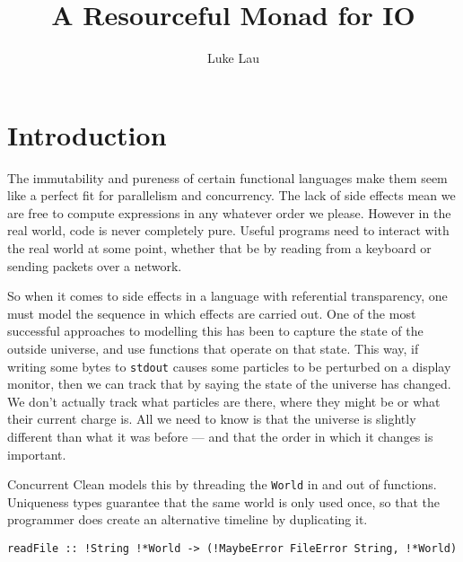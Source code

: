 \documentclass{report}
\begin{document}
\newcommand{\llbracket}{[\![}
\newcommand{\rrbracket}{]\!]}
\newcommand{\IO}{\mathsf{IO}}
\newcommand{\bind}{>\!\!>\!\!=} \newcommand{\concbind}{>\!\!>\!>\!\!=}
\newcommand{\subtyp}{\geq:}
\newcommand{\notsubtyp}{\ngeq:}
\newcommand{\lift}[1]{\ensuremath{\llbracket#1\rrbracket}}
\newcommand{\use}[2]{\ensuremath{\llbracket#2\rrbracket_{#1}}}
\newcommand{\ftv}{\operatorname{FTV}}
\newcommand{\fv}{\operatorname{FV}}
\newtheorem{theorem}{Theorem}
\newtheorem{lemma}{Lemma}

\author{Luke Lau}
\title{A Resourceful Monad for IO}
\begin{titlepage}
  \maketitle
\end{titlepage}

\chapter{Introduction}
The immutability and pureness of certain functional languages make them seem
like a perfect fit for parallelism and concurrency. The lack of side effects
mean we are free to compute expressions in any whatever order we please. However
in the real world, code is never completely pure. Useful programs need to
interact with the real world at some point, whether that be by reading from a
keyboard or sending packets over a network.

So when it comes to side effects in a language with referential transparency,
one must model the sequence in which effects are carried out. One of the most
successful approaches to modelling this has been to capture the state of the
outside universe, and use functions that operate on that state. This way, if
writing some bytes to \texttt{stdout} causes some particles to be perturbed on a
display monitor, then we can track that by saying the state of the universe has
changed. We don't actually track what particles are there, where they might
be or what their current charge is. All we need to know is that the universe is
slightly different than what it was before --- and that the order in which it
changes is important.

Concurrent Clean models this by threading the \texttt{World} in and out of
functions. Uniqueness types guarantee that the same world is only used once, so
that the programmer does create an alternative timeline by duplicating it.

\begin{verbatim}
readFile :: !String !*World -> (!MaybeError FileError String, !*World)
\end{verbatim}
\end{document}
